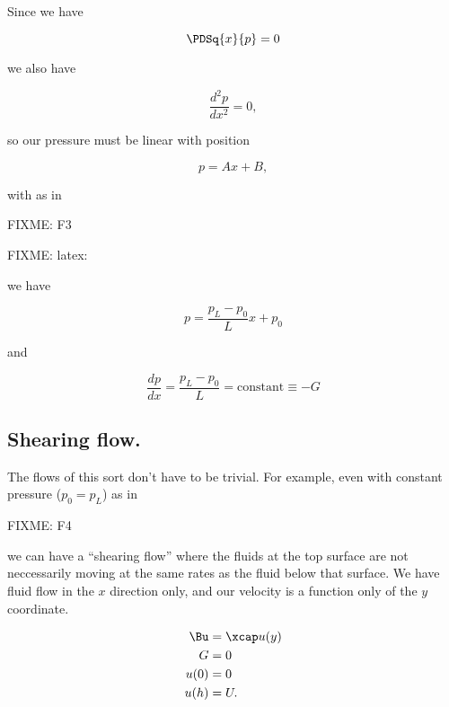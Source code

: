 Since we have

\begin{equation}\label{eqn:continuumL11:370}
\PDSq{x}{p} = 0
\end{equation}

we also have

\begin{equation}\label{eqn:continuumL11:390}
\frac{d^2 p}{dx^2} = 0,
\end{equation}

so our pressure must be linear with position

\begin{equation}\label{eqn:continuumL11:410}
p = A x + B,
\end{equation}

with as in 

FIXME: F3

FIXME: latex:

we have

\begin{equation}\label{eqn:continuumL11:450}
p = \frac{p_L - p_0}{L} x + p_0
\end{equation}

and

\begin{equation}\label{eqn:continuumL11:470}
\frac{dp}{dx} = \frac{p_L - p_0}{L} = \text{constant} \equiv -G
\end{equation}

\subsection{Shearing flow.}

The flows of this sort don't have to be trivial.  For example, even with constant pressure ($p_0 = p_L$) as in

FIXME: F4

we can have a ``shearing flow'' where the fluids at the top surface are not neccessarily moving at the same rates as the fluid below that surface.  We have fluid flow in the $x$ direction only, and our velocity is a function only of the $y$ coordinate.

\begin{align}\label{eqn:continuumL11:490}
\Bu &= \xcap u(y) \\
G &= 0 \\
u(0) &= 0 \\
u(h) &= U.
\end{align}

